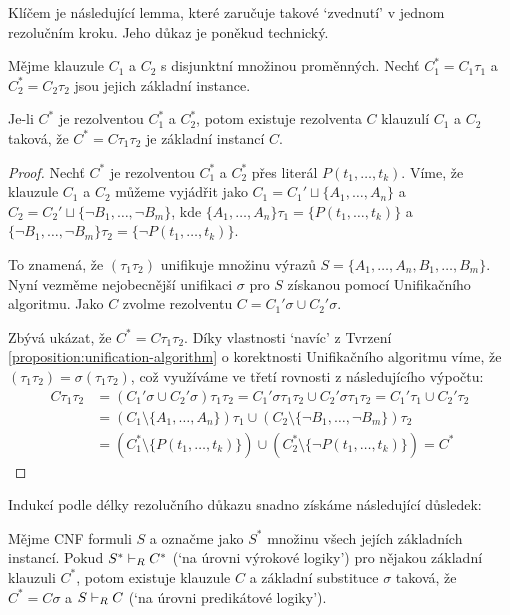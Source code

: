 Klíčem je následující lemma, které zaručuje takové `zvednutí' v jednom rezolučním kroku. Jeho důkaz je poněkud technický. 

\begin{lemma}\label{lemma:lifting-lemma}
Mějme klauzule $C_1$ a $C_2$ s disjunktní množinou proměnných. Nechť $C^*_1=C_1\tau_1$ a $C^*_2=C_2\tau_2$ jsou jejich základní instance.

Je-li $C^*$ je rezolventou $C^*_1$ a $C^*_2$, potom existuje rezolventa $C$ klauzulí $C_1$ a $C_2$ taková, že $C^*=C\tau_1\tau_2$ je základní instancí $C$.
\end{lemma}
\begin{proof}
Nechť $C^*$ je rezolventou $C_1^*$ a $C_2^*$ přes literál $P(t_1,\dots,t_k)$. Víme, že klauzule $C_1$ a $C_2$ můžeme vyjádřit jako $C_1=C_1' \sqcup \{A_1,\dots,A_n\}$ a $C_2=C_2' \sqcup \{\neg B_1,\dots,\neg B_m\}$, kde $\{A_1,\dots,A_n\}\tau_1=\{P(t_1,\dots,t_k)\}$ a $\{\neg B_1,\dots,\neg B_m\}\tau_2=\{\neg P(t_1,\dots,t_k)\}$.

To znamená, že $(\tau_1\tau_2)$ unifikuje množinu výrazů $S=\{A_1,\dots,A_n,B_1,\dots,B_m\}$. Nyní vezměme nejobecnější unifikaci $\sigma$ pro $S$ získanou pomocí Unifikačního algoritmu. Jako $C$ zvolme rezolventu $C=C_1'\sigma \cup C_2'\sigma$.

Zbývá ukázat, že $C^*=C\tau_1\tau_2$. Díky vlastnosti `navíc' z Tvrzení \ref{proposition:unification-algorithm} o korektnosti Unifikačního algoritmu víme, že $(\tau_1\tau_2)=\sigma(\tau_1\tau_2)$, což využíváme ve třetí rovnosti z následujícího výpočtu:
\begin{align*}
    C\tau_1\tau_2&= (C_1'\sigma \cup C_2'\sigma)\tau_1\tau_2=C_1'\sigma\tau_1\tau_2 \cup C_2'\sigma\tau_1\tau_2=C_1'\tau_1 \cup C_2'\tau_2\\
    &=(C_1\setminus\{A_1,\dots,A_n\})\tau_1\cup (C_2\setminus\{\neg B_1,\dots,\neg B_m\})\tau_2\\
    &=(C_1^*\setminus\{P(t_1,\dots,t_k)\})\cup(C_2^*\setminus \{\neg P(t_1,\dots,t_k)\})=C^*
\end{align*}
\end{proof}

Indukcí podle délky rezolučního důkazu snadno získáme následující důsledek:

\begin{corollary}\label{corollary:lifting}
Mějme CNF formuli $S$ a označme jako $S^*$ množinu všech jejích základních instancí. Pokud $S^*\vdash_R C^*$ (`na úrovni výrokové logiky') pro nějakou základní klauzuli $C^*$, potom existuje klauzule $C$ a základní substituce $\sigma$ taková, že $C^*=C\sigma$ a $S\vdash_R C$ (`na úrovni predikátové logiky').
\end{corollary}

